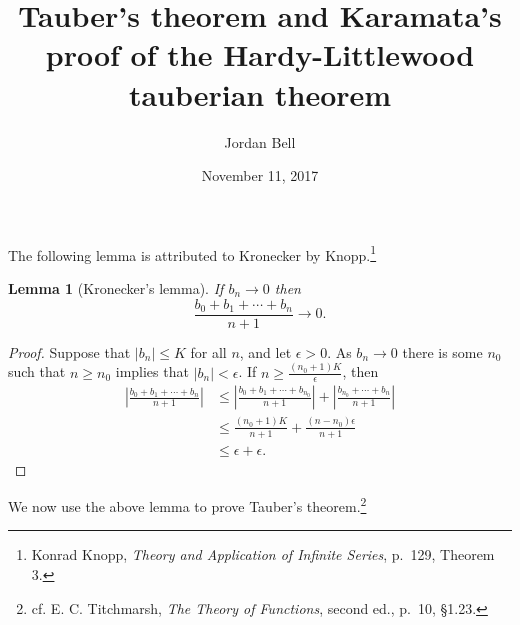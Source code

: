 \documentclass{article}
\newtheorem{lemma}[theorem]{Lemma}
\begin{document}
\title{Tauber's theorem and Karamata's proof of the Hardy-Littlewood tauberian theorem}
\author{Jordan Bell}
\date{November 11, 2017}
\maketitle

The following lemma is attributed to Kronecker by Knopp.\footnote{Konrad Knopp, {\em Theory and Application of Infinite Series}, p.~129, Theorem 3.}

\begin{lemma}[Kronecker's lemma]
If $b_n \to 0$ then
\[
\frac{b_0+b_1+\cdots+b_n}{n+1} \to 0.
\]
\label{limitlemma}
\end{lemma}
\begin{proof}
Suppose that $|b_n| \leq K$ for all $n$, and let $\epsilon>0$. As $b_n \to 0$ there is some $n_0$ such that $n \geq n_0$ implies that
$|b_n|<\epsilon$. If $n \geq \frac{(n_0+1)K}{\epsilon}$, then
\begin{align*}
\left| \frac{b_0+b_1+\cdots+b_n}{n+1} \right| &\leq 
\left| \frac{b_0+b_1+\cdots+b_{n_0}}{n+1} \right| 
+\left| \frac{b_{n_0}+\cdots+b_n}{n+1} \right|\\
&\leq \frac{(n_0+1)K}{n+1}+\frac{(n-n_0)\epsilon}{n+1}\\
&\leq \epsilon+\epsilon.
\end{align*}
\end{proof}

We now use the above lemma to prove Tauber's theorem.\footnote{cf. E. C. Titchmarsh, {\em The Theory of Functions}, second ed., p.~10, \S 1.23.}
\end{document}
